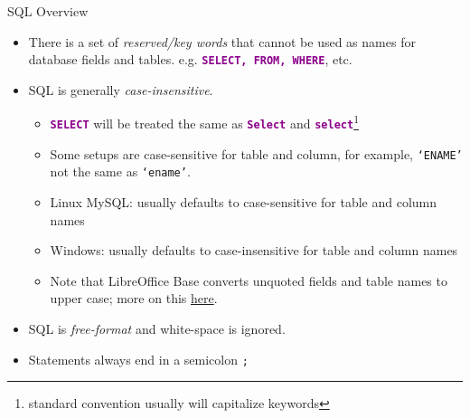 \documentclass[xcolor=svgnames]{beamer}
\newcommand{\nl}{\\[1em]}
\newcommand{\command}[1]{\texttt{\textbf{\textcolor{DarkMagenta}{#1}}}}
\theoremstyle{example}
\begin{document}
\begin{frame}{SQL Overview}

\begin{itemize}
\item There is a set of \emph{reserved/key words} that cannot be used as names for database fields and tables. e.g. \command{SELECT, FROM, WHERE}, etc.\medskip

\item SQL is generally \emph{case-insensitive}.
\begin{itemize}
\item  \command{SELECT} will be treated the same as \command{Select} and \command{select}\footnote{standard convention usually will capitalize keywords}
\item Some setups are case-sensitive for table and column, for example, %
 {\tt `ENAME'} not the same as {\tt `ename'}.
\item Linux MySQL:  usually defaults to case-sensitive for table and column names 
\item Windows: usually defaults to case-insensitive for table and column names 
\item  Note that  LibreOffice Base converts unquoted fields and table names to upper case; more on this \href{https://eeperry.wordpress.com/2013/11/15/libreoffice-base-sql-creating-tables/}{here}.
\end{itemize}
\medskip
\item SQL is \emph{free-format} and white-space is ignored.\medskip
\item Statements always end in a semicolon {\tt ;}
\end{itemize}
\end{frame}


%
%
%
\end{document}
